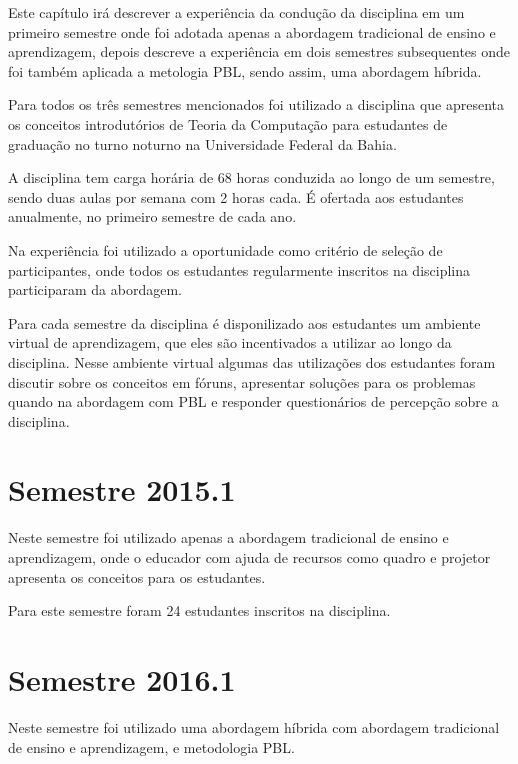 \acresetall

Este capítulo irá descrever a experiência da condução da disciplina em um primeiro
semestre onde foi adotada apenas a abordagem tradicional de ensino e aprendizagem,
depois descreve a experiência em dois semestres subsequentes onde foi também aplicada a metologia PBL,
sendo assim, uma abordagem híbrida.

Para todos os três semestres mencionados foi utilizado a disciplina que apresenta os
conceitos introdutórios de Teoria da Computação para estudantes de graduação no turno noturno
na Universidade Federal da Bahia.

A disciplina tem carga horária de 68 horas conduzida ao longo de um semestre, sendo duas
aulas por semana com 2 horas cada.
É ofertada aos estudantes anualmente, no primeiro semestre de cada ano.

Na experiência foi utilizado a oportunidade como critério de seleção de participantes, onde todos os
estudantes regularmente inscritos na disciplina participaram da abordagem.

Para cada semestre da disciplina é disponilizado aos estudantes um ambiente virtual de aprendizagem,
que eles são incentivados a utilizar ao longo da disciplina.
Nesse ambiente virtual algumas das utilizações dos estudantes foram discutir sobre os conceitos
em fóruns, apresentar soluções para os problemas quando na abordagem com PBL e responder
questionários de percepção sobre a disciplina.

\section{Semestre 2015.1}
Neste semestre foi utilizado apenas a abordagem tradicional de ensino e aprendizagem, onde o educador
com ajuda de recursos como quadro e projetor apresenta os conceitos para os estudantes.

Para este semestre foram 24 estudantes inscritos na disciplina.


\section{Semestre 2016.1}

Neste semestre foi utilizado uma abordagem híbrida com abordagem tradicional de ensino
e aprendizagem, e metodologia PBL.

